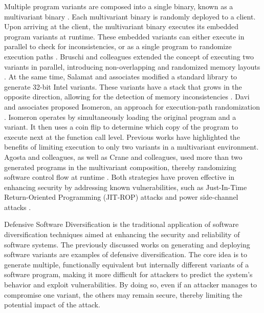 Multiple program variants are composed into a single binary, known as a multivariant binary \cite{cox06}. 
Each multivariant binary is randomly deployed to a client.
Upon arriving at the client, the multivariant binary executes its embedded program variants at runtime. 
These embedded variants can either execute in parallel to check for inconsistencies, or as a single program to randomize execution paths \cite{bhatkar03}. 
Bruschi and colleagues extended the concept of executing two variants in parallel, introducing non-overlapping and randomized memory layouts \cite{bruschi2007diversified}. 
At the same time, Salamat and associates modified a standard library to generate 32-bit Intel variants. These variants have a stack that grows in the opposite direction, allowing for the detection of memory inconsistencies \cite{salamat2007stopping}. 
Davi and associates proposed Isomeron, an approach for execution-path randomization \cite{davi2015isomeron}. 
Isomeron operates by simultaneously loading the original program and a variant. It then uses a coin flip to determine which copy of the program to execute next at the function call level. 
Previous works have highlighted the benefits of limiting execution to only two variants in a multivariant environment. 
Agosta and colleagues, as well as Crane and colleagues, used more than two generated programs in the multivariant composition, thereby randomizing software control flow at runtime \cite{agosta2015meet, crane2015thwarting}. 
Both strategies have proven effective in enhancing security by addressing known vulnerabilities, such as Just-In-Time Return-Oriented Programming (JIT-ROP) attacks \cite{jackson2011compiler} and power side-channel attacks \cite{amarilli2011can}. 



Defensive Software Diversification is the traditional application of software diversification techniques aimed at enhancing the security and reliability of software systems.
The previously discussed works on generating and deploying software variants are examples of defensive diversification.
The core idea is to generate multiple, functionally equivalent but internally different variants of a software program, making it more difficult for attackers to predict the system's behavior and exploit vulnerabilities. 
By doing so, even if an attacker manages to compromise one variant, the others may remain secure, thereby limiting the potential impact of the attack.


